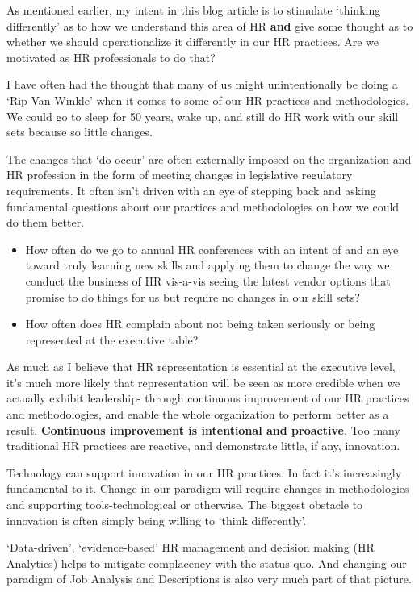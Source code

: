 \documentclass[12pt,letterpaper]{article}
\begin{document}
{{{As mentioned earlier, my intent in this blog article is to stimulate
`thinking differently' as to how we understand this area of HR
\textbf{and} give some thought as to whether we should operationalize it
differently in our HR practices. Are we motivated as HR professionals to
do that?

I have often had the thought that many of us might unintentionally be
doing a `Rip Van Winkle' when it comes to some of our HR practices and
methodologies. We could go to sleep for 50 years, wake up, and still do
HR work with our skill sets because so little changes.

The changes that `do occur' are often externally imposed on the
organization and HR profession in the form of meeting changes in
legislative regulatory requirements. It often isn't driven with an eye
of stepping back and asking fundamental questions about our practices
and methodologies on how we could do them better.

\begin{itemize}
\item
  How often do we go to annual HR conferences with an intent of and an
  eye toward truly learning new skills and applying them to change the
  way we conduct the business of HR vis-a-vis seeing the latest vendor
  options that promise to do things for us but require no changes in our
  skill sets?
\item
  How often does HR complain about not being taken seriously or being
  represented at the executive table?
\end{itemize}

As much as I believe that HR representation is essential at the
executive level, it's much more likely that representation will be seen
as more credible when we actually exhibit leadership- through continuous
improvement of our HR practices and methodologies, and enable the whole
organization to perform better as a result. \textbf{Continuous
improvement is intentional and proactive}. Too many traditional HR
practices are reactive, and demonstrate little, if any, innovation.

Technology can support innovation in our HR practices. In fact it's
increasingly fundamental to it. Change in our paradigm will require
changes in methodologies and supporting tools-technological or
otherwise. The biggest obstacle to innovation is often simply being
willing to `think differently'.

`Data-driven', `evidence-based' HR management and decision making (HR
Analytics) helps to mitigate complacency with the status quo. And
changing our paradigm of Job Analysis and Descriptions is also very much
part of that picture.

}}}
\end{document}
